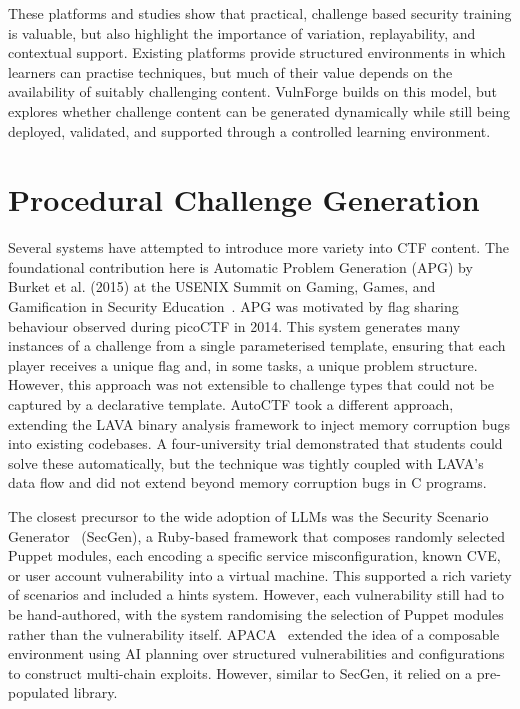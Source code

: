 These platforms and studies show that practical, challenge based security training is valuable, but also highlight the importance of variation, replayability, and contextual support. Existing platforms provide structured environments in which learners can practise techniques, but much of their value depends on the availability of suitably challenging content. VulnForge builds on this model, but explores whether challenge content can be generated dynamically while still being deployed, validated, and supported through a controlled learning environment.


\section{Procedural Challenge Generation}\label{sec:procedural}
Several systems have attempted to introduce more variety into CTF content. The foundational contribution here is Automatic Problem Generation (APG) by Burket et al. (2015) at the USENIX Summit on Gaming, Games, and Gamification in Security Education~\citep{burket_automatic_2015}. APG was motivated by flag sharing behaviour observed during picoCTF in 2014. This system generates many instances of a challenge from a single parameterised template, ensuring that each player receives a unique flag and, in some tasks, a unique problem structure. However, this approach was not extensible to challenge types that could not be captured by a declarative template. AutoCTF took a different approach, extending the LAVA binary analysis framework to inject memory corruption bugs into existing codebases. A four-university trial demonstrated that students could solve these automatically, but the technique was tightly coupled with LAVA's data flow and did not extend beyond memory corruption bugs in C programs.

The closest precursor to the wide adoption of LLMs was the Security Scenario Generator~\citep{schreuders_security_nodate} (SecGen), a Ruby-based framework that composes randomly selected Puppet modules, each encoding a specific service misconfiguration, known CVE, or user account vulnerability into a virtual machine. This supported a rich variety of scenarios and included a hints system. However, each vulnerability still had to be hand-authored, with the system randomising the selection of Puppet modules rather than the vulnerability itself. APACA~\citep{eckroth_alpaca_2019} extended the idea of a composable environment using AI planning over structured vulnerabilities and configurations to construct multi-chain exploits. However, similar to SecGen, it relied on a pre-populated library.


